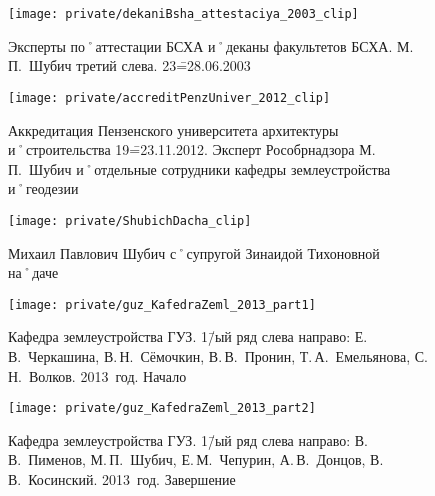 \begin{figure}[h]
\texttt{[image: private/dekaniBsha\_attestaciya\_2003\_clip]}
\caption{Эксперты по˚аттестации БСХА и˚деканы факультетов БСХА. М.\,П.~Шубич третий слева. 23\==28.06.2003}
\label{fig:dekaniBsha_attestaciya_2003}
\end{figure}

\begin{figure}[h]
\texttt{[image: private/accreditPenzUniver\_2012\_clip]}
\caption{Аккредитация Пензенского университета архитектуры и˚строительства 19\==23.11.2012. Эксперт Рособрнадзора М.\,П.~Шубич и˚отдельные сотрудники кафедры землеустройства и˚геодезии}
\label{fig:accreditPenzUniver_2012}
\end{figure}

\begin{figure}[h]
\texttt{[image: private/ShubichDacha\_clip]}
\caption{Михаил Павлович Шубич с˚супругой Зинаидой Тихоновной на˚даче}
\label{fig:ShubichDacha_clip}
\end{figure}

\begin{figure} %
	\texttt{[image: private/guz\_KafedraZeml\_2013\_part1]}
	\caption{Кафедра землеустройства ГУЗ. 1\=/ый ряд слева направо: Е.\,В.~Черкашина, В.\,Н.~Сёмочкин, В.\,В.~Пронин, Т.\,А.~Емельянова, С.\,Н.~Волков. 2013~год. Начало}
	\label{fig:guz_KafedraZeml_2013_parts}
\end{figure} %
  
\begin{figure} 
	\ContinuedFloat %
	\texttt{[image: private/guz\_KafedraZeml\_2013\_part2]}
	\caption{Кафедра землеустройства ГУЗ. 1\=/ый ряд слева направо: В.\,В.~Пименов, М.\,П.~Шубич, Е.\,М.~Чепурин, А.\,В.~Донцов, В.\,В.~Косинский. 2013~год. Завершение}
\end{figure} %

\makeatletter
\setlength{\@fptop}{0pt plus 1fil}
\setlength{\@fpbot}{0pt plus 1fil}
\makeatother